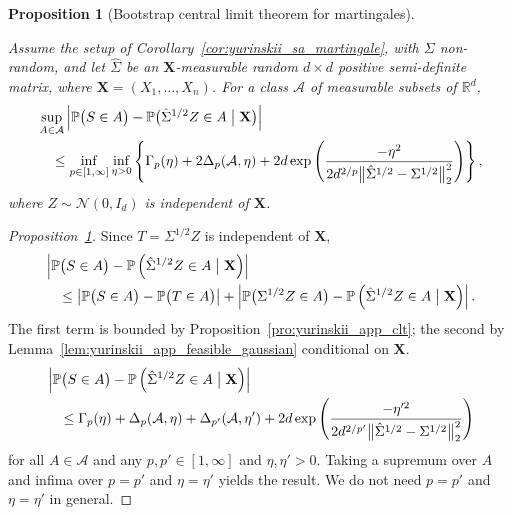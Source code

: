 \documentclass[11pt,lof]{puthesis}
\renewcommand{\P}{\ensuremath{\mathbb{P}}}
\newcommand{\R}{\ensuremath{\mathbb{R}}}
\newcommand{\bX}{\ensuremath{\mathbf{X}}}
\newcommand{\cN}{\ensuremath{\mathcal{N}}}
\newcommand{\cA}{\ensuremath{\mathcal{A}}}
\theoremstyle{break}
\newtheorem{proposition}{Proposition}[section]
\theoremstyle{proof}
\newtheorem{proof}{Proof}
\begin{document}
\begin{proposition}[Bootstrap central limit theorem for martingales]%
\label{pro:yurinskii_app_bootstrap}

Assume the setup of Corollary~\ref{cor:yurinskii_sa_martingale},
with $\Sigma$ non-random,
and let $\hat \Sigma$ be an $\bX$-measurable random
$d \times d$ positive semi-definite matrix,
where $\bX = (X_1, \ldots, X_n)$.
For a class $\cA$ of measurable subsets of $\R^d$,
%
\begin{align*}
&\sup_{A\in \cA}
\left|
\P\big(S \in A\big)
- \P\big(\hat \Sigma^{1/2} Z \in A \bigm| \bX \big)
\right| \\
&\quad\leq
\inf_{p \in [1,\infty]} \inf_{\eta>0}
\left\{ \Gamma_p(\eta) + 2 \Delta_p(\cA, \eta)
+ 2d \exp\left(\frac{-\eta^2}
{2d^{2/p}\big\|\hat \Sigma^{1/2} - \Sigma^{1/2}\big\|_2^2}
\right)
\right\},
\end{align*}
%
where $Z \sim \cN(0,I_d)$ is independent of $\bX$.
\end{proposition}

\begin{proof}[Proposition~\ref{pro:yurinskii_app_bootstrap}]

Since $T = \Sigma^{1/2} Z$ is independent of $\bX$,
%
\begin{align*}
&\left|
\P\big(S \in A\big)
- \P\left(\hat \Sigma^{1/2} Z \in A \bigm| \bX\right)
\right| \\
&\quad\leq
\left|
\P\big(S \in A\big)
- \P\big(T \in A\big)
\right|
+\left|
\P\big(\Sigma^{1/2} Z \in A\big)
- \P\left(\hat \Sigma^{1/2} Z \in A \bigm| \bX\right)
\right|.
\end{align*}
%
The first term is bounded by Proposition~\ref{pro:yurinskii_app_clt};
the second by Lemma~\ref{lem:yurinskii_app_feasible_gaussian}
conditional on $\bX$.
%
\begin{align*}
&\left|
\P\big(S \in A\big)
- \P\left(\hat \Sigma^{1/2} Z \in A \bigm| \bX\right)
\right| \\
&\quad\leq
\Gamma_p(\eta) + \Delta_p(\cA, \eta)
+ \Delta_{p'}(\cA, \eta')
+ 2 d \exp \left( \frac{-\eta'^2}
{2 d^{2/p'} \big\|\hat\Sigma^{1/2} - \Sigma^{1/2}\big\|_2^2}
\right)
\end{align*}
%
for all $A \in \cA$
and any $p, p' \in [1, \infty]$ and $\eta, \eta' > 0$.
Taking a supremum over $A$ and infima over
$p = p'$ and $\eta = \eta'$ yields the result.
We do not need
$p = p'$ and $\eta = \eta'$ in general.
%
\end{proof}
\end{document}
